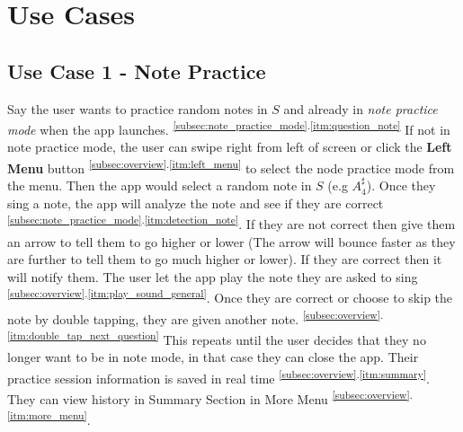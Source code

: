 \documentclass{article}
\begin{document}
\section{Use Cases}
\subsection{Use Case 1 - Note Practice}
\qquad
		Say the user wants to practice random notes in $S$ and already in \textit{note practice mode} when the app launches. \textsuperscript{\ref{subsec:note_practice_mode}.\ref{itm:question_note}}
		If not in note practice mode, the user can swipe right from left of screen or click  the \textbf{Left Menu} button \textsuperscript{\ref{subsec:overview}.\ref{itm:left_menu}} to select the node practice mode from the menu.
    Then the app would select a random note in $S$ (e.g $A_4^\sharp$). Once they sing a note, the app will analyze the note and see if they are correct \textsuperscript{\ref{subsec:note_practice_mode}.\ref{itm:detection_note}}. 
    If they are not correct then give them an arrow to tell them to go higher or lower (The arrow will bounce faster as they are further to tell them to go much higher or lower). 
    If they are correct then it will notify them. 
    The user let the app play the note they are asked to sing \textsuperscript{\ref{subsec:overview}.\ref{itm:play_sound_general}}. 
    Once they are correct or choose to skip the note by double tapping, they are given another note. \textsuperscript{\ref{subsec:overview}.\ref{itm:double_tap_next_question}}
    This repeats until the user decides that they no longer want to be in note mode, in that case they can close the app. 
    Their practice session information is saved in real time \textsuperscript{\ref{subsec:overview}.\ref{itm:summary}}. 
    They can view history in Summary Section in More Menu \textsuperscript{\ref{subsec:overview}.\ref{itm:more_menu}}.
\end{document}

